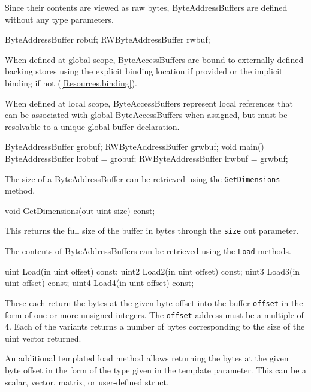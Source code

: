 
Since their contents are viewed as raw bytes, ByteAddressBuffers are defined without any type parameters.
\begin{HLSL}
  ByteAddressBuffer robuf;
  RWByteAddressBuffer rwbuf;
\end{HLSL}

When defined at global scope, ByteAccessBuffers are bound to externally-defined backing stores
using the explicit binding location if provided or the implicit binding if not (\ref{Resources.binding}).

When defined at local scope, ByteAccessBuffers represent local references
that can be associated with global ByteAccessBuffers when assigned,
but must be resolvable to a unique global buffer declaration.

\begin{HLSL}
  ByteAddressBuffer grobuf;
  RWByteAddressBuffer grwbuf;
  void main() {
    ByteAddressBuffer lrobuf = grobuf;
    RWByteAddressBuffer lrwbuf = grwbuf;
  }
\end{HLSL}


The size of a ByteAddressBuffer can be retrieved using the \texttt{GetDimensions} method.
\begin{HLSL}
void GetDimensions(out uint size) const;
\end{HLSL}

This returns the full size of the buffer in bytes through the \texttt{size} out parameter.


The contents of ByteAddressBuffers can be retrieved using the \texttt{Load} methods.

\begin{HLSL}
 uint Load(in uint offset) const;
 uint2 Load2(in uint offset) const;
 uint3 Load3(in uint offset) const;
 uint4 Load4(in uint offset) const;
\end{HLSL}

These each return the bytes at the given byte offset into the buffer \texttt{offset} in the form of one or more unsigned integers.
The \texttt{offset} address must be a multiple of 4.
Each of the variants returns a number of bytes corresponding to the size of the uint vector returned.

An additional templated load method allows returning the bytes at the given byte offset in the form
of the type given in the template parameter. This can be a scalar, vector, matrix, or user-defined struct.

